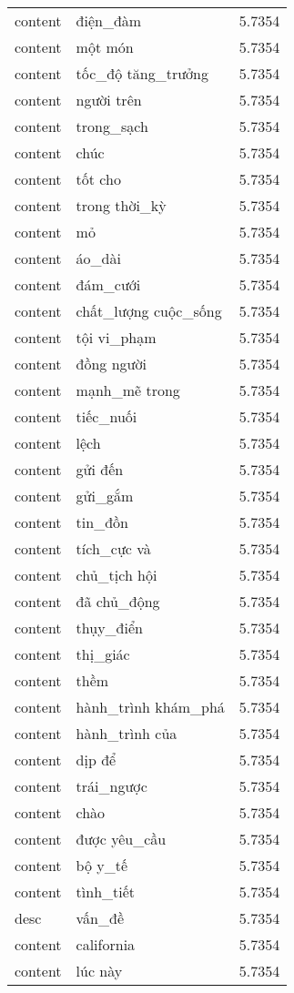 \documentclass{article}
\begin{document}
\begin{tabular}{lll}
content & điện\_đàm & 5.7354\\
content & một món & 5.7354\\
content & tốc\_độ tăng\_trưởng & 5.7354\\
content & người trên & 5.7354\\
content & trong\_sạch & 5.7354\\
content & chúc & 5.7354\\
content & tốt cho & 5.7354\\
content & trong thời\_kỳ & 5.7354\\
content & mỏ & 5.7354\\
content & áo\_dài & 5.7354\\
content & đám\_cưới & 5.7354\\
content & chất\_lượng cuộc\_sống & 5.7354\\
content & tội vi\_phạm & 5.7354\\
content & đồng người & 5.7354\\
content & mạnh\_mẽ trong & 5.7354\\
content & tiếc\_nuối & 5.7354\\
content & lệch & 5.7354\\
content & gửi đến & 5.7354\\
content & gửi\_gắm & 5.7354\\
content & tin\_đồn & 5.7354\\
content & tích\_cực và & 5.7354\\
content & chủ\_tịch hội & 5.7354\\
content & đã chủ\_động & 5.7354\\
content & thụy\_điển & 5.7354\\
content & thị\_giác & 5.7354\\
content & thềm & 5.7354\\
content & hành\_trình khám\_phá & 5.7354\\
content & hành\_trình của & 5.7354\\
content & dịp để & 5.7354\\
content & trái\_ngược & 5.7354\\
content & chào & 5.7354\\
content & được yêu\_cầu & 5.7354\\
content & bộ y\_tế & 5.7354\\
content & tình\_tiết & 5.7354\\
desc & vấn\_đề & 5.7354\\
content & california & 5.7354\\
content & lúc này & 5.7354\\

\end{tabular}
\end{document}
